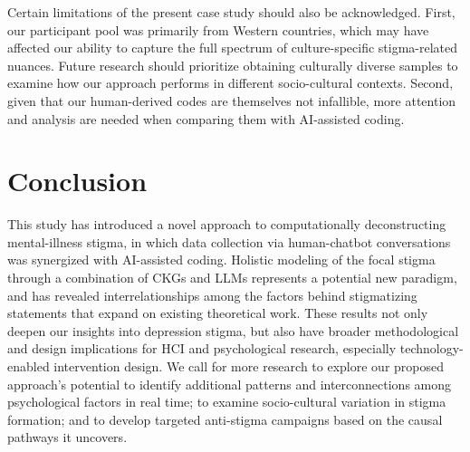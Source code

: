Certain limitations of the present case study should also be acknowledged. 
First, our participant pool was primarily from Western countries, which may have affected our ability to capture the full spectrum of culture-specific stigma-related nuances. 
Future research should prioritize obtaining culturally diverse samples to examine how our approach performs in different socio-cultural contexts. 
Second, given that our human-derived codes are themselves not infallible, more attention and analysis are needed when comparing them with AI-assisted coding.







\section{Conclusion}

This study has introduced a novel approach to computationally deconstructing mental-illness stigma, in which data collection via human-chatbot conversations was synergized with AI-assisted coding. 
Holistic modeling of the focal stigma through a combination of CKGs and LLMs represents a potential new paradigm, and has revealed interrelationships among the factors behind stigmatizing statements that expand on existing theoretical work. 
These results not only deepen our insights into depression stigma, but also have broader methodological and design implications for HCI and psychological research, especially technology-enabled intervention design. 
We call for more research to explore our proposed approach's potential to identify additional patterns and interconnections among psychological factors in real time; to examine socio-cultural variation in stigma formation; and to develop targeted anti-stigma campaigns based on the causal pathways it uncovers.


